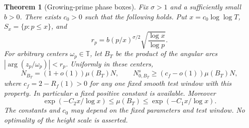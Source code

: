 \documentclass[11pt,letterpaper]{article}
\newtheorem{theorem}{Theorem}[section]
\theoremstyle{definition}
\theoremstyle{remark}
\newcommand{\T}{\mathbb T}
\newcommand{\1}{\mathbf 1}
\begin{document}
\begin{theorem}[Growing-prime phase boxes]
\label{p04:thm:growing-boxes}
Fix $\sigma>1$ and a sufficiently small $b>0$. There exists
$c_0>0$ such that the following holds. Put $x=c_0\log\log T$,
$S_x=\{p:p\le x\}$, and
\[
 r_p=b(p/x)^{\sigma/2}
           \sqrt{\frac{\log x}{\log p}}.
\]
For arbitrary centers $\omega_p\in\T$, let $B_T$ be the product
of the angular arcs $|\arg(z_p/\omega_p)|<r_p$. Uniformly in
these centers,
\[
 N_{B_T}=(1+o(1))\mu(B_T)N,\qquad
 N^s_{0,B_T}\ge(c_f-o(1))\mu(B_T)N,
\]
where $c_f=2-R_f(1)>0$ for any one fixed smooth test window
with this property. In particular a fixed positive constant is
available. Moreover
\[
 \exp(-C_2x/\log x)\le\mu(B_T)
       \le\exp(-C_1x/\log x).
\]
The constants and $c_0$ may depend on the fixed parameters and
test window. No optimality of the height scale is asserted.
\end{theorem}
\end{document}
